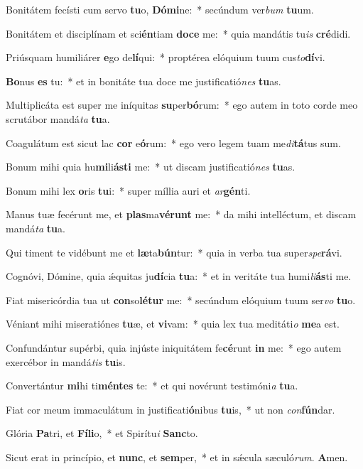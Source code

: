 ﻿\item Bonitátem fecísti cum servo \textbf{tu}o, \textbf{Dó}\textbf{mi}ne:~* secúndum ver\emph{bum} \textbf{tu}um.
\item Bonitátem et disciplínam et sci\textbf{én}tiam \textbf{do}\textbf{ce} me:~* quia mandátis tu\emph{is} \textbf{cré}didi.
\item Priúsquam humiliárer \textbf{e}go de\textbf{lí}qui:~* proptérea elóquium tuum cus\emph{to}\textbf{dí}vi.
\item \textbf{Bo}nus \textbf{es} tu:~* et in bonitáte tua doce me justificatió\emph{nes} \textbf{tu}as.
\item Multiplicáta est super me iníquitas \textbf{su}per\textbf{bó}rum:~* ego autem in toto corde meo scrutábor mandá\emph{ta} \textbf{tu}a.
\item Coagulátum est sicut lac \textbf{cor} e\textbf{ó}rum:~* ego vero legem tuam me\emph{di}\textbf{tá}tus sum.
\item Bonum mihi quia hu\textbf{mi}li\textbf{ás}\textbf{ti} me:~* ut discam justificatió\emph{nes} \textbf{tu}as.
\item Bonum mihi lex \textbf{o}ris \textbf{tu}i:~* super míllia auri et \emph{ar}\textbf{gén}ti.
\item Manus tuæ fecérunt me, et \textbf{plas}ma\textbf{vé}\textbf{runt} me:~* da mihi intelléctum, et discam mandá\emph{ta} \textbf{tu}a.
\item Qui timent te vidébunt me et \textbf{læ}ta\textbf{bún}tur:~* quia in verba tua super\emph{spe}\textbf{rá}vi.
\item Cognóvi, Dómine, quia ǽquitas ju\textbf{dí}cia \textbf{tu}a:~* et in veritáte tua humi\emph{li}\textbf{ás}ti me.
\item Fiat misericórdia tua ut \textbf{con}so\textbf{lé}\textbf{tur} me:~* secúndum elóquium tuum ser\emph{vo} \textbf{tu}o.
\item Véniant mihi miseratiónes \textbf{tu}æ, et \textbf{vi}vam:~* quia lex tua meditáti\emph{o} \textbf{me}a est.
\item Confundántur supérbi, quia injúste iniquitátem fe\textbf{cé}runt \textbf{in} me:~* ego autem exercébor in mandá\emph{tis} \textbf{tu}is.
\item Convertántur \textbf{mi}hi ti\textbf{mén}\textbf{tes} te:~* et qui novérunt testimóni\emph{a} \textbf{tu}a.
\item Fiat cor meum immaculátum in justificati\textbf{ó}nibus \textbf{tu}is,~* ut non \emph{con}\textbf{fún}dar.
\item Glória \textbf{Pa}tri, et \textbf{Fí}\textbf{li}o,~* et Spirítu\emph{i} \textbf{Sanc}to.
\item Sicut erat in princípio, et \textbf{nunc}, et \textbf{sem}per,~* et in sǽcula sæculó\emph{rum}. \textbf{A}men.
